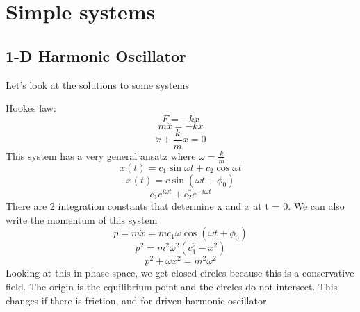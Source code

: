 \section{Simple systems}
\subsection{1-D Harmonic Oscillator}
Let's look at the solutions to some systems

Hookes law:
\begin{equation}
F = -kx 
\end{equation}
\begin{equation}
m\ddot{x} = -kx
\end{equation}
\begin{equation}
\ddot{x} + \frac{k}{m} x = 0
\end{equation}
This system has a very general ansatz where $\omega = \frac{k}{m}$
\begin{equation}
x(t) = c_1 \sin\omega t + c_2 \cos\omega t
\end{equation}
\begin{equation}
x(t) = c\sin(\omega t + \phi_0)
\end{equation}
\begin{equation}
c_1 e^{i\omega t} + c_2^* e^{-i \omega t}
\end{equation}
There are 2 integration constants that determine x and $\dot{x}$ at t = 0. We can also write the momentum of this system
\begin{equation}
p = m\dot{x} = mc_1 \omega \cos(\omega t + \phi_0)
\end{equation}
\begin{equation}
p^2 = m^2 \omega^2 (c_1^2 - x^2)
\end{equation}
\begin{equation}
p^2 + \omega x^2 = m^2 \omega^2
\end{equation}
Looking at this in phase space, we get closed circles because this is a conservative field. The origin is the equilibrium point and the circles do not intersect. This changes if there is friction, and for driven harmonic oscillator

